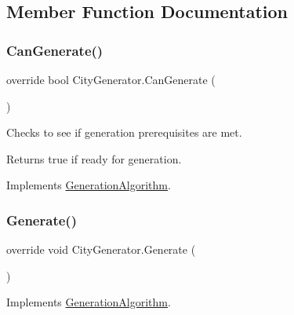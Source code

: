 \subsection{Member Function Documentation}
\mbox{\label{class_city_generator_abae83261cf4eea2ed07339b644ed13af}} 
\subsubsection{\texorpdfstring{Can\+Generate()}{CanGenerate()}}
{\footnotesize\ttfamily override bool City\+Generator.\+Can\+Generate (\begin{DoxyParamCaption}{ }\end{DoxyParamCaption})\hspace{0.3cm}{\ttfamily [virtual]}}



Checks to see if generation prerequisites are met. 

\begin{DoxyReturn}{Returns}
true if ready for generation.
\end{DoxyReturn}


Implements \mbox{\hyperlink{class_generation_algorithm_af7d03e24e3b7fecfe2ae43f06915986d}{Generation\+Algorithm}}.

\mbox{\label{class_city_generator_aa80ad8d8d723fd17f6bf9a4fe89dec4f}} 
\subsubsection{\texorpdfstring{Generate()}{Generate()}}
{\footnotesize\ttfamily override void City\+Generator.\+Generate (\begin{DoxyParamCaption}{ }\end{DoxyParamCaption})\hspace{0.3cm}{\ttfamily [virtual]}}



Implements \mbox{\hyperlink{class_generation_algorithm_ac2df20f7751c1b480ab958791d5c7d41}{Generation\+Algorithm}}.

\mbox{\label{class_city_generator_a1b17b4a2ea1d8a4cc1b320829da286ae}} 
